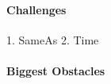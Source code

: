 \documentclass[11pt,titlepage,oneside,openany]{book}
\begin{document}
\paragraph{Challenges}
\label{sec:challenges}

1. SameAs 
2. Time

\paragraph{Biggest Obstacles}
\label{sec:obstacle}

\label{sec:idea}



\appendix

\newpage
\end{document}
